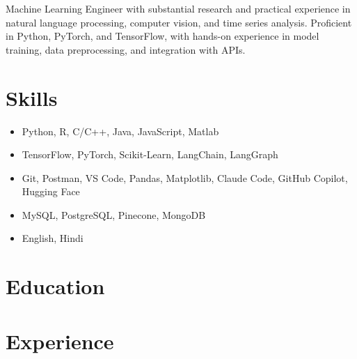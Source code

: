 \documentclass[letterpaper, 10pt]{article}
\begin{document}



Machine Learning Engineer with substantial research and practical experience in natural language processing, computer vision, and time series analysis.
Proficient in Python, PyTorch, and TensorFlow, with hands-on experience in model training, data preprocessing, and integration with APIs.


\section{Skills}

\begin{itemize}[itemsep=-2px, parsep=1pt, leftmargin=130pt]
  \item[\textbf{Programming languages}] Python, R, C/C++, Java, JavaScript, Matlab
  \item[\textbf{AI frameworks}] TensorFlow, PyTorch, Scikit-Learn, LangChain, LangGraph
  \item[\textbf{Tools}] Git, Postman, VS Code, Pandas, Matplotlib, Claude Code, GitHub Copilot, Hugging Face
  \item[\textbf{Databases}] MySQL, PostgreSQL, Pinecone, MongoDB
  \item[\textbf{Languages}] English, Hindi
\end{itemize}


\section{Education}




\section{Experience}
\end{document}
